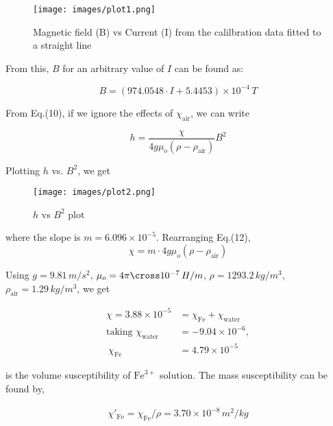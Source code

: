     \begin{figure}[H]
        \centering
        \texttt{[image: images/plot1.png]}
        \caption{Magnetic field (B) vs Current (I) from the calilbration data fitted to a straight line}
        \label{plot:1}
    \end{figure}

    From this, $B$ for an arbitrary value of $I$ can be found as:

    \begin{equation}
        B = (974.0548\cdot I + 5.4453)\times10^{-4}\,T
    \end{equation}

    From Eq.(10), if we ignore the effects of $\chi_\text{air}$, we can write

    \begin{equation}
        h = \frac{\chi}{4g\mu_o(\rho - \rho_\text{air})}B^2
    \end{equation}

    Plotting $h$ vs. $B^2$, we get

    \begin{figure}[H]
        \centering
        \texttt{[image: images/plot2.png]}
        \caption{$h$ vs $B^2$ plot}
        \label{plot:2}
    \end{figure}

    where the slope is $m=6.096\times10^{-5}$. Rearranging Eq.(12), 
    \begin{equation*}
        \chi = m\cdot4g\mu_o(\rho - \rho_\text{air})
    \end{equation*}

    Using $g=9.81\,m/s^2$, $\mu_o=4\pi\cross10^{-7}\,H/m$, $\rho=1293.2\,kg/m^3$, $\rho_\text{air}=1.29\,kg/m^3$, we get

    \begin{align*}
        \chi = 3.88 \times 10^{-5} &= \chi_\text{Fe} + \chi_\text{water}\\
        \text{taking }\chi_\text{water}&=-9.04\times10^{-6},\\\
        \chi_\text{Fe} &= 4.79\times10^{-5}
    \end{align*}

    is the volume susceptibility of $\text{Fe}^{3+}$ solution. The mass susceptibility can be found by,

    \begin{align*}
        \chi'_\text{Fe} = \chi_\text{Fe}/\rho = 3.70\times10^{-8}\,m^2/kg
    \end{align*}

